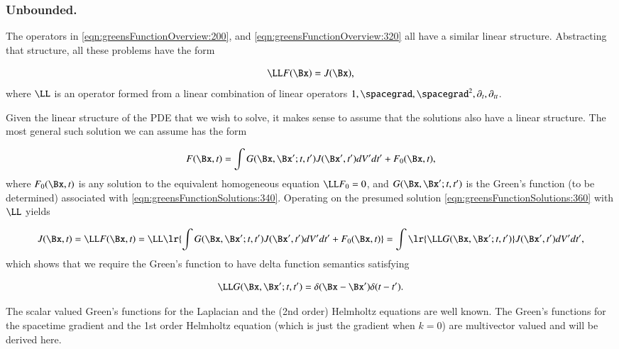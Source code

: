 %
%
\subsubsection{Unbounded.}

The operators in \cref{eqn:greensFunctionOverview:200}, and \cref{eqn:greensFunctionOverview:320} all have a similar linear structure.
Abstracting that structure, all these problems have the form

\begin{dmath}\label{eqn:greensFunctionSolutions:340}
\LL F(\Bx) = J(\Bx),
\end{dmath}
where \( \LL \) is an operator formed from a linear combination of linear operators \( 1, \spacegrad, \spacegrad^2, \partial_t, \partial_{tt} \).

Given the linear structure of the PDE that we wish to solve, it makes sense to assume that the solutions also have a linear structure.
The most general such solution we can assume has the form

\begin{dmath}\label{eqn:greensFunctionSolutions:360}
F(\Bx, t) = \int G(\Bx, \Bx' ; t, t') J(\Bx', t') dV' dt' + F_0(\Bx, t),
\end{dmath}
where \( F_0(\Bx, t) \) is any solution to the equivalent homogeneous equation \( \LL F_0 = 0 \), and \( G(\Bx, \Bx' ; t, t') \) is the Green's function (to be determined) associated with \cref{eqn:greensFunctionSolutions:340}.
Operating on the presumed solution
\cref{eqn:greensFunctionSolutions:360} with \( \LL \) yields

\begin{dmath}\label{eqn:greensFunctionSolutions:380}
J(\Bx, t) = \LL F(\Bx, t) = \LL\lr{
\int G(\Bx, \Bx' ; t, t') J(\Bx', t') dV' dt' + F_0(\Bx, t) }
=
\int \lr{ \LL G(\Bx, \Bx'; t, t') } J(\Bx', t') dV' dt',
\end{dmath}
which shows that we require the Green's function to have delta function semantics satisfying

\begin{dmath}\label{eqn:greensFunctionSolutions:400}
\LL G(\Bx, \Bx' ; t, t') = \delta(\Bx - \Bx') \delta(t - t').
\end{dmath}

The scalar valued Green's functions for the Laplacian and the (2nd order) Helmholtz equations are well known.
The Green's functions for the spacetime gradient and the 1st order Helmholtz equation (which is just the gradient when \( k = 0 \)) are multivector valued and will be derived here.

